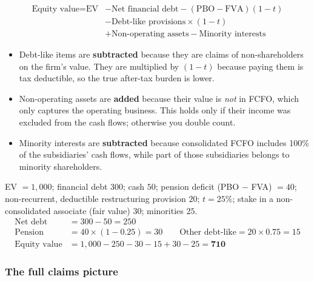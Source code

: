 \begin{keybox}
\begin{align*}
\text{Equity value} = \text{EV} &- \text{Net financial debt} - (\text{PBO}-\text{FVA})(1-t)\\
&- \text{Debt-like provisions}\times(1-t)\\
&+ \text{Non-operating assets} - \text{Minority interests}
\end{align*}
\end{keybox}

\begin{addbox}
\begin{itemize}[leftmargin=*]
  \item Debt-like items are \textbf{subtracted} because they are claims of non-shareholders on the firm's value. They are multiplied by $(1-t)$ because paying them is tax deductible, so the true after-tax burden is lower.
  \item Non-operating assets are \textbf{added} because their value is \emph{not} in FCFO, which only captures the operating business. This holds only if their income was excluded from the cash flows; otherwise you double count.
  \item Minority interests are \textbf{subtracted} because consolidated FCFO includes 100\% of the subsidiaries' cash flows, while part of those subsidiaries belongs to minority shareholders.
\end{itemize}
\end{addbox}

\begin{exbox}
EV $=1{,}000$; financial debt $300$; cash $50$; pension deficit (PBO $-$ FVA) $=40$; non-recurrent, deductible restructuring provision $20$; $t=25\%$; stake in a non-consolidated associate (fair value) $30$; minorities $25$.
\begin{align*}
\text{Net debt} &= 300-50 = 250\\
\text{Pension} &= 40\times(1-0.25)=30 \qquad \text{Other debt-like} = 20\times 0.75 = 15\\
\text{Equity value} &= 1{,}000-250-30-15+30-25 = \mathbf{710}
\end{align*}
\end{exbox}

\subsubsection*{The full claims picture }

